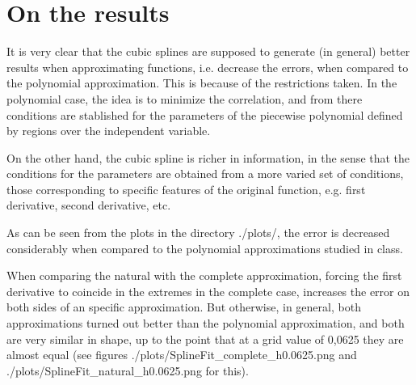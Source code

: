 \documentclass[paper=a4, fontsize=11pt]{scrartcl} %
\numberwithin{equation}{section} %
\numberwithin{figure}{section} %
\numberwithin{table}{section} %
\begin{document}
\section{On the results}

It is very clear that the cubic splines are supposed to generate (in general) better results when approximating functions, i.e. decrease the errors, when compared to the polynomial approximation. This is because of the restrictions taken. In the polynomial case, the idea is to minimize the correlation, and from there conditions are stablished for the parameters of the piecewise polynomial defined by regions over the independent variable.

On the other hand, the cubic spline is richer in information, in the sense that the conditions for the parameters are obtained from a more varied set of conditions, those corresponding to specific features of the original function, e.g. first derivative, second derivative, etc.

As can be seen from the plots in the directory ./plots/, the error is decreased considerably when compared to the polynomial approximations studied in class.

When comparing the natural with the complete approximation, forcing the first derivative to coincide in the extremes in the complete case, increases the error on both sides of an specific approximation. But otherwise, in general, both approximations turned out better than the polynomial approximation, and both are very similar in shape, up to the point that at a grid value of 0,0625 they are almost equal (see figures ./plots/SplineFit\_complete\_h0.0625.png and ./plots/SplineFit\_natural\_h0.0625.png for this).
\end{document}
